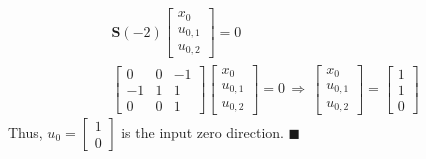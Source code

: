 \documentclass[twoside]{article}
\begin{document}
%
\begin{align*}
&\mathbf{S}(-2) \begin{bmatrix} x_0 \\ u_{0,1} \\ u_{0,2} \end{bmatrix} = 0
\\
&\left[ \begin{array}{c|cc} 0 & 0 & - 1 \\ \hline -1 & 1 & 1 \\ 0 & 0 & 1 \end{array} \right] \left[ \begin{array}{c} x_0 \\ \hline u_{0,1} \\ u_{0,2} \end{array} \right] = 0 \, \Rightarrow \, 
\left[ \begin{array}{c} x_0 \\ \hline u_{0,1} \\ u_{0,2} \end{array} \right] = 
\left[ \begin{array}{c} 1 \\ \hline 1 \\ 0 \end{array} \right]
\end{align*}
%
Thus, $u_0 = \begin{bmatrix} 1 \\ 0 \end{bmatrix}$ is the input zero direction. \hfill $\blacksquare$

\end{document}
